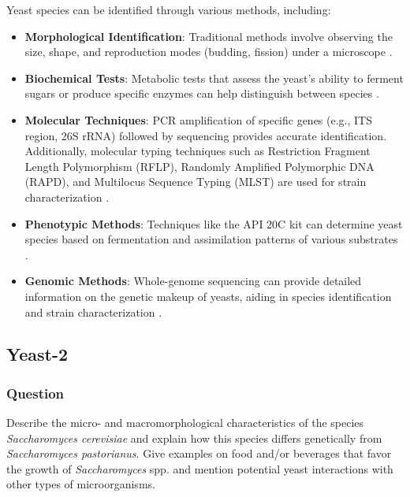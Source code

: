 Yeast species can be identified through various methods, including:
\begin{itemize}
    \item \textbf{Morphological Identification}: Traditional methods involve observing the size, shape, and reproduction modes (budding, fission) under a microscope \cite*{L6-Yeasts,L9-Coryn}.
    \item \textbf{Biochemical Tests}: Metabolic tests that assess the yeast's ability to ferment sugars or produce specific enzymes can help distinguish between species \cite*{L6-Yeasts,L9-Coryn}.
    \item \textbf{Molecular Techniques}: PCR amplification of specific genes (e.g., ITS region, 26S rRNA) followed by sequencing provides accurate identification. Additionally, molecular typing techniques such as Restriction Fragment Length Polymorphism (RFLP), Randomly Amplified Polymorphic DNA (RAPD), and Multilocus Sequence Typing (MLST) are used for strain characterization \cite*{L9-ISAPP,L6-Yeasts}.
    \item \textbf{Phenotypic Methods}: Techniques like the API 20C kit can determine yeast species based on fermentation and assimilation patterns of various substrates \cite*{L6-Yeasts}.
    \item \textbf{Genomic Methods}: Whole-genome sequencing can provide detailed information on the genetic makeup of yeasts, aiding in species identification and strain characterization \cite*{L9-ISAPP}.
\end{itemize}

\subsection{Yeast-2}
\subsubsection*{Question}
Describe the micro- and macromorphological characteristics of the species \textit{Saccharomyces cerevisiae} and explain how this species differs genetically from \textit{Saccharomyces pastorianus}. Give examples on food and/or beverages that favor the growth of \textit{Saccharomyces} spp. and mention potential yeast interactions with other types of microorganisms. 

